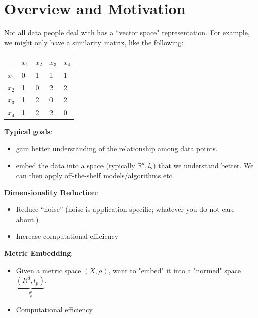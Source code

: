 \section{Overview and Motivation}
Not all data people deal with has a ``vector space"
representation. For example, we might only have a similarity matrix,
like the following: 
\begin{center}
  \begin{tabular}{ | l | l | l | l | l |}
    \hline
    & $x_1$ & $x_2$ & $x_3$ & $x_4$\\
    \hline
    $x_1$ & 0 & 1 & 1 & 1 \\ \hline
    $x_2$ & 1 & 0 & 2 & 2 \\ \hline
    $x_3$ & 1 & 2 & 0 & 2 \\ \hline
    $x_4$ & 1 & 2 & 2 & 0 \\ \hline
    \hline
  \end{tabular}
\end{center}

\textbf{Typical goals}:
\begin{itemize}
\item gain better understanding of the relationship among data points.
\item embed the data into a space (typically $\mathbb{R}^d,l_2$) that
  we understand better. We can then apply off-the-shelf
  models/algorithms etc. 
\end{itemize}

\textbf{Dimensionality Reduction}:
\begin{itemize}
\item Reduce ``noise'' (noise is application-specific; whatever you do
  not care about.) 
\item Increase computational efficiency
\end{itemize}

\textbf{Metric Embedding}:
\begin{itemize}
\item Given a metric space $(X,\rho)$, want to "embed" it into a
  "normed" space $\underbrace{(R^d,l_p)}_{l^p_\rho}$. 
\item Computational efficiency
\end{itemize}

